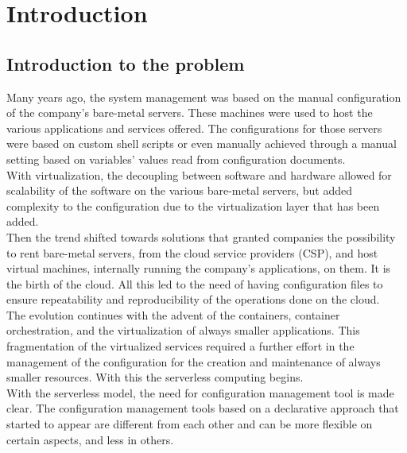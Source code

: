 
\chapter{Introduction}
\label{cap:introduction}


\section{Introduction to the problem}
Many years ago, the system management was based on the manual configuration of the company's bare-metal servers.
These machines were used to host the various applications and services offered.
The configurations for those servers were based on custom shell scripts or even manually achieved through a manual setting based on variables' values read from configuration documents.\\
With virtualization, the decoupling between software and hardware allowed for scalability of the software on the various bare-metal servers, but added complexity to the configuration due to the virtualization layer that has been added.\\
Then the trend shifted towards solutions that granted companies the possibility to rent bare-metal servers, from the cloud service providers (CSP), and host virtual machines, internally running the company's applications, on them.
It is the birth of the cloud.
All this led to the need of having configuration files to ensure repeatability and reproducibility of the operations done on the cloud.\\
The evolution continues with the advent of the containers, container orchestration, and the virtualization of always smaller applications.
This fragmentation of the virtualized services required a further effort in the management of the configuration for the creation and maintenance of always smaller resources.
With this the serverless computing begins.\\
With the serverless model, the need for configuration management tool is made clear.
The configuration management tools based on a declarative approach that started to appear are different from each other and can be more flexible on certain aspects, and less in others.
